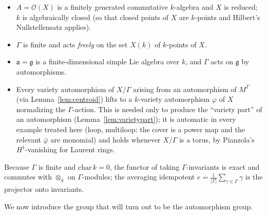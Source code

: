 \documentclass{amsart}
\theoremstyle{definition}
\newcommand{\g}{\mathfrak{g}}
\newcommand{\fa}{\mathfrak{a}}
\newcommand{\OO}{\mathcal{O}}
\newcommand{\M}{M}
\begin{document}
\begin{itemize}
\item[(H1)] $A=\OO(X)$ is a finitely generated commutative $k$-algebra and
$X$ is reduced; $k$ is algebraically closed (so that closed points of $X$
are $k$-points and Hilbert's Nullstellensatz applies).
\item[(H2)] $\Gamma$ is finite and acts \emph{freely} on the set $X(k)$ of
$k$-points of $X$.
\item[(H3)] $\fa=\g$ is a finite-dimensional simple Lie algebra over $k$,
and $\Gamma$ acts on $\g$ by automorphisms.
\item[(H4)] Every variety automorphism of $X/\Gamma$ arising from an
automorphism of $\M^\Gamma$ (via Lemma~\ref{lem:centroid}) lifts to a
$k$-variety automorphism $\varphi$ of $X$ normalizing the $\Gamma$-action.
This is needed only to produce the ``variety part'' of an automorphism
(Lemma~\ref{lem:varietypart}); it is automatic in every example treated
here (loop, multiloop: the cover is a power map and the relevant
$\bar\varphi$ are monomial) and holds whenever $X/\Gamma$ is a torus, by
Pianzola's $H^1$-vanishing for Laurent rings.
\end{itemize}

Because $\Gamma$ is finite and $\mathrm{char}\,k=0$, the functor of taking
$\Gamma$-invariants is exact and commutes with $\otimes_k$ on
$\Gamma$-modules; the averaging idempotent
$e=\frac1{|\Gamma|}\sum_{\gamma\in\Gamma}\gamma$ is the projector onto
invariants.

\medskip
We now introduce the group that will turn out to be the automorphism
group.
\end{document}
